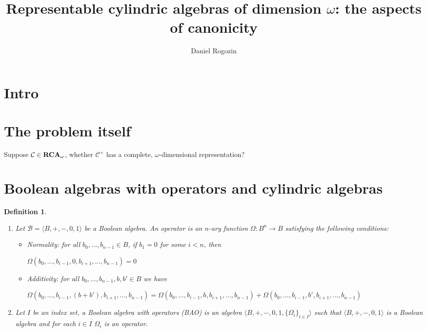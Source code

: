 \documentclass[a4paper]{article}
\author{Daniel Rogozin}
\date{}
\title{Representable cylindric algebras of dimension $\omega$: the aspects of canonicity}
\theoremstyle{defin}
\newtheorem{defin}{Definition}
\theoremstyle{theorem}
\theoremstyle{prop}
\theoremstyle{lemma}
\theoremstyle{fact}
\theoremstyle{ex}
\theoremstyle{col}
\begin{document}
\maketitle

\section{Intro}

\section{The problem itself}

Suppose $\mathcal{C} \in {\bf RCA}_{\omega}$, whether $\mathcal{C}^{+}$ has a complete, $\omega$-dimensional representation? \cite{hirsch2002relation}

\section{Boolean algebras with operators and cylindric algebras}

\begin{defin}

$ $

  \begin{enumerate}
    \item Let $\mathcal{B} = \langle B, +, -, 0, 1 \rangle$ be a Boolean algebra. An operator is an $n$-ary function $\Omega : B^n \to B$ satisfying the following conditions:
    \begin{itemize}
      \item Normality: for all $b_0, \dots, b_{n - 1} \in B$, if $b_1 = 0$ for some $i < n$, then

\begin{center}
      $\Omega(b_0, \dots, b_{i - 1}, 0, b_{i+1}, \dots, b_{n - 1}) = 0$
\end{center}
      \item Additivity: for all $b_0, \dots, b_{n - 1}, b, b' \in B$ we have
      \begin{center}
        $\Omega(b_0, \dots, b_{i - 1}, (b + b'), b_{i+1}, \dots, b_{n - 1}) = \Omega(b_0, \dots, b_{i - 1}, b, b_{i+1}, \dots, b_{n - 1}) + \Omega(b_0, \dots, b_{i - 1}, b', b_{i+1}, \dots, b_{n - 1})$
      \end{center}
    \end{itemize}
    \item Let $I$ be an index set, a Boolean algebra with operators (BAO) is an algebra $\langle B, +, -, 0, 1, \{ \Omega_{i} \}_{i \in I} \rangle$ such that $\langle B, +, -, 0, 1 \rangle$ is a Boolean algebra and for each $i \in I$ $\Omega_{i}$ is an operator.
  \end{enumerate}
\end{defin}
\end{document}
